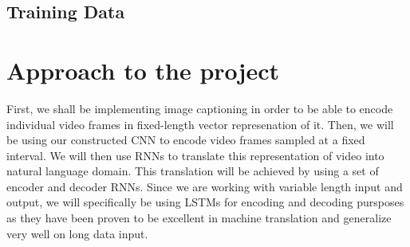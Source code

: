 \documentclass{article}
\begin{document}
			\subsection{Training Data}




			


	\section{Approach to the project}
		First, we shall be implementing image captioning in order to be able to encode individual video frames in fixed-length vector represenation of it.
		Then, we will be using our constructed CNN to encode video frames sampled at a fixed interval.
		We will then use RNNs to translate this representation of video into natural language domain. This translation will be achieved by using a set of encoder and decoder RNNs. Since we are working with variable length input and output, we will specifically be using LSTMs for encoding and decoding pursposes as they have been proven to be excellent in machine translation and generalize very well on long data input.
\end{document}
